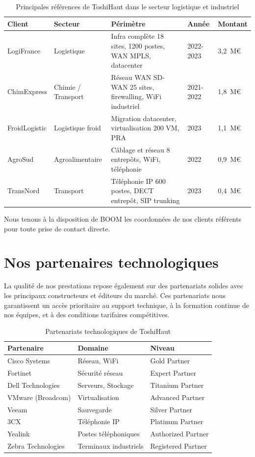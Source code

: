 \documentclass[12pt,a4paper]{report}
\begin{document}
\begin{table}[H]
\centering
\small
\begin{tabularx}{\textwidth}{@{}L{2.6cm}L{2.9cm}L{4.3cm}C{1.7cm}R{1.7cm}@{}}
\toprule
\textbf{Client} & \textbf{Secteur} & \textbf{Périmètre} & \textbf{Année} & \textbf{Montant} \\
\midrule
LogiFrance & Logistique & Infra complète 18 sites, 1200 postes, WAN MPLS, datacenter & 2022-2023 & 3,2~M\euro{} \\
\addlinespace
ChimExpress & Chimie / Transport & Réseau WAN SD-WAN 25 sites, firewalling, WiFi industriel & 2021-2022 & 1,8~M\euro{} \\
\addlinespace
FroidLogistic & Logistique froid & Migration datacenter, virtualisation 200 VM, PRA & 2023 & 1,1~M\euro{} \\
\addlinespace
AgroSud & Agroalimentaire & Câblage et réseau 8 entrepôts, WiFi, téléphonie & 2022 & 0,9~M\euro{} \\
\addlinespace
TransNord & Transport & Téléphonie IP 600 postes, DECT entrepôt, SIP trunking & 2023 & 0,4~M\euro{} \\
\bottomrule
\end{tabularx}
\caption{Principales références de ToshiHaut dans le secteur logistique et industriel}
\label{tab:references}
\end{table}

Nous tenons à la disposition de BOOM les coordonnées de nos clients référents pour toute prise de contact directe.

\section{Nos partenaires technologiques}

La qualité de nos prestations repose également sur des partenariats solides avec les principaux constructeurs et éditeurs du marché. Ces partenariats nous garantissent un accès prioritaire au support technique, à la formation continue de nos équipes, et à des conditions tarifaires compétitives.

\begin{table}[H]
\centering
\begin{tabular}{lll}
\toprule
\textbf{Partenaire} & \textbf{Domaine} & \textbf{Niveau} \\
\midrule
Cisco Systems & Réseau, WiFi & Gold Partner \\
Fortinet & Sécurité réseau & Expert Partner \\
Dell Technologies & Serveurs, Stockage & Titanium Partner \\
VMware (Broadcom) & Virtualisation & Advanced Partner \\
Veeam & Sauvegarde & Silver Partner \\
3CX & Téléphonie IP & Platinum Partner \\
Yealink & Postes téléphoniques & Authorized Partner \\
Zebra Technologies & Terminaux industriels & Registered Partner \\
\bottomrule
\end{tabular}
\caption{Partenariats technologiques de ToshiHaut}
\label{tab:partenaires}
\end{table}
\end{document}
